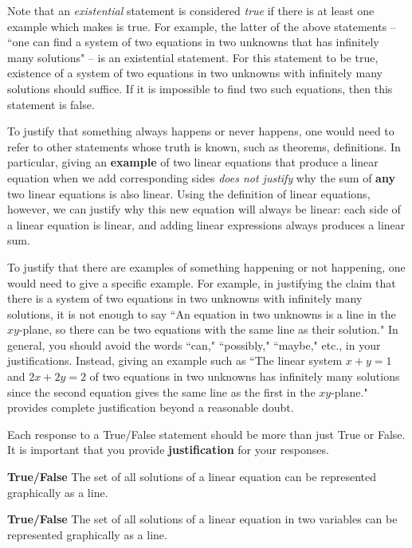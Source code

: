 Note that an {\em existential} statement is considered {\em true} if there is at least one example which makes is true. For example, the latter of the above statements -- ``one can find a system of two equations in two unknowns that has infinitely many solutions" -- is an existential statement. For this statement to be true, existence of a system of two equations in two unknowns with infinitely many solutions should suffice. If it is impossible to find two such equations, then this statement is false.



To justify that something always happens or never happens, one would need to refer to other statements whose truth is known, such as theorems, definitions. In particular, giving an \textbf{example} of two linear equations that produce a linear equation when we add corresponding sides \emph{does not justify} why the sum of \textbf{any} two linear equations is also linear. Using the definition of linear equations, however, we can justify why this new equation will always be linear: each side of a linear equation is linear, and adding linear expressions always produces a linear sum. 



To justify that there are examples of something happening or not happening, one would need to give a specific example. For example, in justifying the claim that there is a system of two equations in two unknowns with infinitely many solutions, it is not enough to say ``An equation in two unknowns is a line in the $xy$-plane, so there can be two equations with the same line as their solution." In general, you should avoid the words ``can," ``possibly," ``maybe," etc., in your justifications. Instead, giving an example such as ``The linear system $x+y=1$ and $2x+2y=2$ of two equations in two unknowns has infinitely many solutions since the second equation gives the same line as the first in the $xy$-plane." provides complete justification beyond a reasonable doubt.


Each response to a True/False statement should be more than just True or False. It is important that you provide \textbf{justification} for your responses. 

\be
\item 
	\ba
	\item \textbf{True/False} The set of all solutions of a linear equation can be represented graphically as a line.


	\item \textbf{True/False} The set of all solutions of a linear equation in two variables can be represented graphically as a line.


